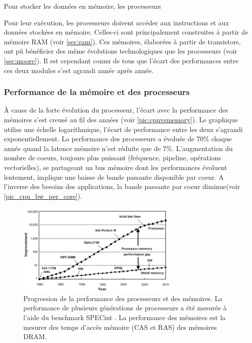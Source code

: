 Pour stocker les données en mémoire, les processeurs 

Pour leur exécution, les processeurs doivent accéder aux instructions et aux données stockées en mémoire. Celles-ci sont principalement construites à partir de mémoire RAM (voir \autoref{sec:ram}). Ces mémoires, élaborées à partir de transistors, ont pû bénéficier des même évolutions technologiques que les processeurs (voir \autoref{sec:moore}). Il est cependant connu de tous que l'écart des performances entre ces deux modules s'est agrandi année après année. 

\subsubsection{Performance de la mémoire et des processeurs}


À cause de la forte évolution du processeur, l'écart avec la performance des mémoires s'est creusé au fil des années (voir \autoref{pic:cpuvsmemory}). Le graphique utilise une échelle logarithmique, l'écart de performance entre les deux s’agrandi exponentiellement. La performance des processeurs a évoluée de 70\% chaque année quand la latence mémoire n’est réduite que de 7\%.
L’augmentation du nombre de coeurs, toujours plus puissant (fréquence, pipeline, opérations vectorielles), se partageant un bus mémoire dont les performances évoluent lentement, implique une baisse de bande passante disponible par coeur. A l’inverse des besoins des applications, la bande passante par coeur diminue(voir \autoref{pic_cpu_bw_per_core}). 
 
 \begin{figure}
    \center
    \includegraphics[width=8cm]{images/cpu_cpu_vs_memory.png}
    \caption{\label{pic:cpuvsmemory} Progression de la performance des processeurs et des mémoires. La performance de plusieurs générations de processeurs a été mesurée à l'aide du benchmark SPECint \cite{Efnusheva2017ASO}. La performance des mémoires est la mesurer des temps d’accès mémoire (CAS et RAS) des mémoires DRAM.}
\end{figure}



